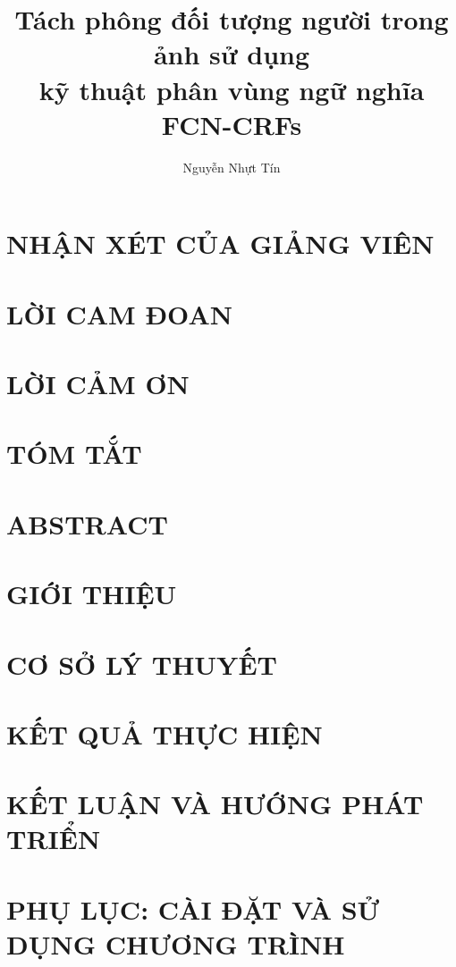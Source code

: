 \documentclass[a4paper,12pt,oneside]{report}
\title{Tách phông đối tượng người trong ảnh sử dụng\\ kỹ thuật phân vùng ngữ nghĩa FCN-CRFs}						%
\author{Nguyễn Nhựt Tín}				%
\begin{document}


\chapter*{NHẬN XÉT CỦA GIẢNG VIÊN}


\chapter*{LỜI CAM ĐOAN}


\chapter*{LỜI CẢM ƠN}




\tableofcontents
\listoffigures
\listoftables
\printglossary[title=TỪ ĐIỂN CHÚ GIẢI]

\chapter*{TÓM TẮT}
 

\chapter*{ABSTRACT}
 



\clearpage
{}			%


\chapter{GIỚI THIỆU}

\chapter{CƠ SỞ LÝ THUYẾT}


\chapter{KẾT QUẢ THỰC HIỆN}


\chapter{KẾT LUẬN VÀ HƯỚNG PHÁT TRIỂN}









\chapter*{PHỤ LỤC: CÀI ĐẶT VÀ SỬ DỤNG CHƯƠNG TRÌNH}

\end{document}
